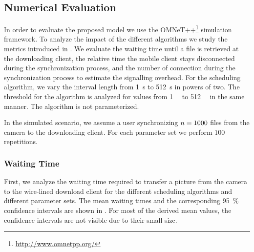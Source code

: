 \subsection{Numerical Evaluation}\label{sec:application:cloud_file_synchronisation:numerical_evaluation}
In order to evaluate the proposed model we use the OMNeT++\footnote{\url{http://www.omnetpp.org/}} simulation framework.
To analyze the impact of the different algorithms we study the metrics introduced in .
We evaluate the waiting time \sojournTime until a file is retrieved at the downloading client, the relative time the mobile client stays disconnected \relativeDisconnectedTime during the synchronization process, and the number of connection \connectionCount during the synchronization process to estimate the signalling overhead.
For the \algointerval scheduling algorithm, we vary the interval length from \SI{1}{\second} to \SI{512}{\second} in powers of two.
The threshold for the \algosize algorithm is analyzed for values from \SI{1}{\mega\byte} to \SI{512}{\mega\byte} in the same manner.
The \algoimmediate algorithm is not parameterized.

In the simulated scenario, we assume a user synchronizing \(n = 1000\) files from the camera to the downloading client.
For each parameter set we perform \(100\) repetitions.

\subsubsection*{Waiting Time}\label{sec:application:cloud_file_synchronisation:numerical_evaluation:waiting_time}
First, we analyze the waiting time \sojournTime required to transfer a picture from the camera to the wire-lined download client for the different scheduling algorithms and different parameter sets.
The mean waiting times and the corresponding \SI{95}{\percent} confidence intervals are shown in .
For most of the derived mean values, the confidence intervals are not visible due to their small size.

